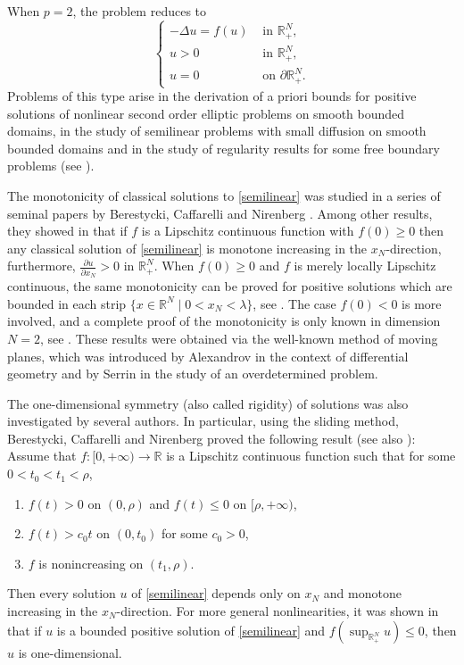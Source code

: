 \documentclass[reqno]{amsart}
\theoremstyle{plain}
\theoremstyle{definition}
\theoremstyle{remark}
\begin{document}
	When $p=2$, the problem reduces to
	\begin{equation}\label{semilinear}
		\begin{cases}
			-\Delta u = f(u) &\text{ in } \mathbb{R}^N_+,\\
			u > 0 &\text{ in } \mathbb{R}^N_+,\\
			u = 0 &\text{ on } \partial\mathbb{R}^N_+.
		\end{cases}
	\end{equation}
	Problems of this type arise in the derivation of a priori bounds for positive solutions of nonlinear second
	order elliptic problems on smooth bounded domains, in the study of semilinear problems with small diffusion on smooth bounded domains and in the study of regularity results for some free boundary
	problems (see \cite{MR619749,MR1044809,MR1260436,MR1470317,MR2145284}).
	
	The monotonicity of classical solutions to \eqref{semilinear} was studied in a series of seminal papers by Berestycki, Caffarelli and Nirenberg \cite{MR1260436,MR1395408,MR1655510,MR1470317}. Among other results, they showed in \cite{MR1395408,MR1655510} that if $f$ is a Lipschitz continuous function with $f(0) \ge0$ then any classical solution of \eqref{semilinear} is monotone increasing in the $x_N$-direction, furthermore, $\frac{\partial u}{\partial x_N} > 0$ in $\mathbb{R}^N_+$. When $f(0) \ge0$ and $f$ is merely locally Lipschitz continuous, the same monotonicity can be proved for positive solutions which are bounded in each strip $\{x\in\mathbb{R}^N \mid 0<x_N<\lambda\}$, see \cite{MR4142367}. The case $f(0) <0$ is more involved, and a complete proof of the monotonicity is only known in dimension $N=2$, see \cite{MR3593525,MR3641643}. These results were obtained via the well-known method of moving planes, which was introduced by Alexandrov \cite{MR143162} in the context of differential geometry and by Serrin \cite{MR333220} in the study of an overdetermined problem.
	
	The one-dimensional symmetry (also called rigidity) of solutions was also investigated by several authors. In particular, using the sliding method, Berestycki, Caffarelli and Nirenberg \cite{MR1470317} proved the following result (see also \cite{MR794096,MR937538}): Assume that $f:[0,+\infty)\to\mathbb{R}$ is a Lipschitz continuous function such that for some $0<t_0<t_1<\rho$,
	\begin{enumerate}
		\item[(i)] $f(t)>0$ on $(0,\rho)$ and $f(t)\le0$ on $[\rho,+\infty)$,
		\item[(ii)] $f(t)>c_0 t$ on $(0,t_0)$ for some $c_0>0$,
		\item[(iii)] $f$ is nonincreasing on $(t_1, \rho)$.
	\end{enumerate}
	Then every solution $u$ of \eqref{semilinear} depends only on $x_N$ and monotone increasing in the $x_N$-direction.
	For more general nonlinearities, it was shown in \cite{MR1260436} that if $u$ is a bounded positive solution of \eqref{semilinear} and $f(\sup_{\mathbb{R}^N_+}u)\le0$, then $u$ is one-dimensional.
	
\end{document}
